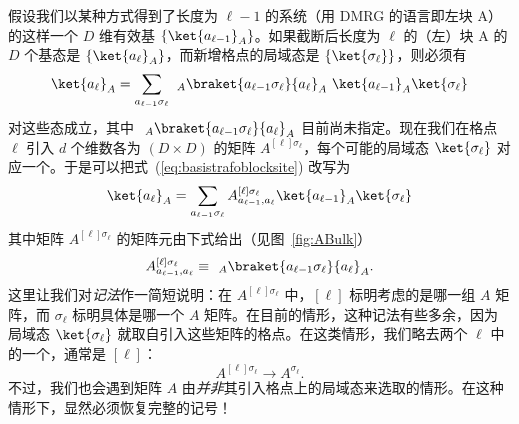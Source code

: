 假设我们以某种方式得到了长度为 $\ell-1$ 的系统（用 DMRG 的语言即左块 A）的这样一个 $D$ 维有效基 $\{ \ket{a_{\ell-1}}_A \}$。如果截断后长度为 $\ell$ 的（左）块 A 的 $D$ 个基态是 $\{ \ket{a_{\ell}}_A \}$，而新增格点的局域态是 $\{ \ket{\sigma_\ell} \}$，则必须有
\begin{equation}
\ket{a_\ell}_A = \sum_{a_{\ell-1}\sigma_\ell} \phantom\langle _A \braket{a_{\ell-1}\sigma_\ell}{a_\ell}_A \,\, \ket{a_{\ell-1}}_A\ket{\sigma_\ell}
\label{eq:basistrafoblocksite}
\end{equation}
对这些态成立，其中 $\phantom\langle _A \braket{a_{\ell-1}\sigma_\ell}{a_\ell}_A$ 目前尚未指定。现在我们在格点 $\ell$ 引入 $d$ 个维数各为 $(D \times D)$ 的矩阵 $A^{[\ell]\sigma_\ell}$，每个可能的局域态 $\ket{\sigma_\ell}$ 对应一个。于是可以把式~(\ref{eq:basistrafoblocksite}) 改写为
\begin{equation}
\ket{a_\ell}_A = \sum_{a_{\ell-1}\sigma_\ell} A^{[\ell]\sigma_\ell}_{a_{\ell-1}, a_\ell} \ket{a_{\ell-1}}_A  \ket{\sigma_\ell} 
\label{eq:matrixbyRG}
\end{equation}
其中矩阵 $A^{[\ell]\sigma_\ell}$ 的矩阵元由下式给出（见图~\ref{fig:ABulk}）
\begin{equation}
A^{[\ell]\sigma_\ell}_{a_{\ell-1}, a_\ell} \equiv \phantom\langle_A \braket{a_{\ell-1}\sigma_\ell}{a_\ell}_A. 
\label{eq:Amatrixelements}
\end{equation}
这里让我们对{\em 记法}作一简短说明：在 $A^{[\ell]\sigma_\ell}$ 中，$[\ell]$ 标明考虑的是哪一组 $A$ 矩阵，而 $\sigma_\ell$ 标明具体是哪一个 $A$ 矩阵。在目前的情形，这种记法有些多余，因为局域态 $\ket{\sigma_\ell}$ 就取自引入这些矩阵的格点。在这类情形，我们略去两个 $\ell$ 中的一个，通常是 $[\ell]$：
\begin{equation}
A^{[\ell]\sigma_\ell} \rightarrow A^{\sigma_\ell} .
\end{equation}
不过，我们也会遇到矩阵 $A$ 由{\em 并非}其引入格点上的局域态来选取的情形。在这种情形下，显然必须恢复完整的记号！

